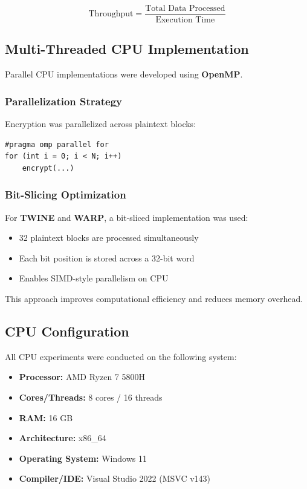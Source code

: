 \begin{equation}
\text{Throughput} = \frac{\text{Total Data Processed}}{\text{Execution Time}}
\end{equation}

\subsection{Multi-Threaded CPU Implementation}

Parallel CPU implementations were developed using \textbf{OpenMP}.

\subsubsection{Parallelization Strategy}

Encryption was parallelized across plaintext blocks:

\begin{verbatim}
#pragma omp parallel for
for (int i = 0; i < N; i++)
    encrypt(...)
\end{verbatim}

\subsubsection{Bit-Slicing Optimization}

For \textbf{TWINE} and \textbf{WARP}, a bit-sliced implementation was used:
\begin{itemize}
    \item 32 plaintext blocks are processed simultaneously
    \item Each bit position is stored across a 32-bit word
    \item Enables SIMD-style parallelism on CPU
\end{itemize}

This approach improves computational efficiency and reduces memory overhead.

\subsection{CPU Configuration}

All CPU experiments were conducted on the following system:

\begin{itemize}
    \item \textbf{Processor:} AMD Ryzen 7 5800H
    \item \textbf{Cores/Threads:} 8 cores / 16 threads
    \item \textbf{RAM:} 16 GB
    \item \textbf{Architecture:} x86\_64
    \item \textbf{Operating System:} Windows 11
    \item \textbf{Compiler/IDE:} Visual Studio 2022 (MSVC v143)
\end{itemize}

